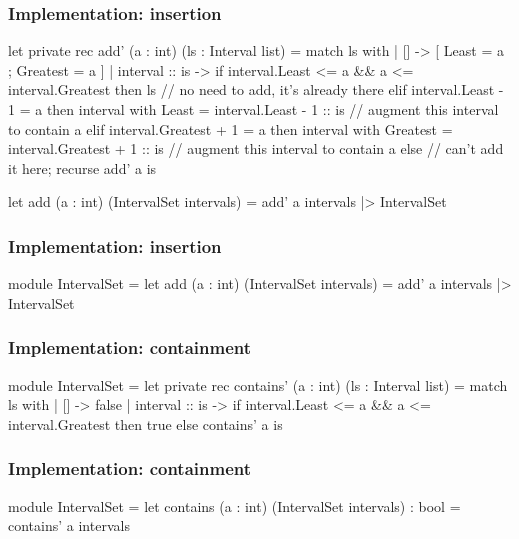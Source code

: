 \documentclass{beamer}
\begin{document}
\begin{frame}[fragile]
\frametitle{Implementation: insertion}
\begin{fslisting}
let private rec add' (a : int) (ls : Interval list) =
    match ls with
    | [] -> [{ Least = a ; Greatest = a }]
    | interval :: is ->
        if interval.Least <= a && a <= interval.Greatest then
            ls // no need to add, it's already there
        elif interval.Least - 1 = a then
            { interval with Least = interval.Least - 1 }
            :: is // augment this interval to contain a
        elif interval.Greatest + 1 = a then
            { interval with Greatest = interval.Greatest + 1 }
            :: is // augment this interval to contain a
        else // can't add it here; recurse
            add' a is

let add (a : int) (IntervalSet intervals) =
    add' a intervals
    |> IntervalSet
\end{fslisting}
\end{frame}

\begin{frame}[fragile]
\frametitle{Implementation: insertion}
\begin{fslisting}
[<RequireQualifiedAccess>]
module IntervalSet =
    let add (a : int) (IntervalSet intervals) =
        add' a intervals
        |> IntervalSet
\end{fslisting}
\end{frame}

\begin{frame}[fragile]
\frametitle{Implementation: containment}

\begin{fslisting}
[<RequireQualifiedAccess>]
module IntervalSet =
    let private rec contains' (a : int) (ls : Interval list) =
        match ls with
        | [] -> false
        | interval :: is ->
            if interval.Least <= a && a <= interval.Greatest then
                true
            else
                contains' a is
\end{fslisting}
\end{frame}

\begin{frame}[fragile]
\frametitle{Implementation: containment}

\begin{fslisting}
[<RequireQualifiedAccess>]
module IntervalSet =
    let contains (a : int) (IntervalSet intervals) : bool =
        contains' a intervals

\end{fslisting}
\end{frame}
\end{document}

